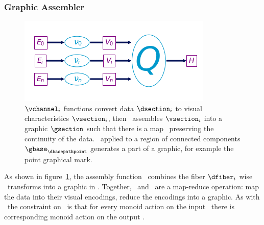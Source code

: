 \documentclass[../main.tex]{subfiles}
\begin{document}
\subsubsection{Graphic Assembler \vmark}
\label{sec:artist_q}
\begin{figure}[H]
    \includegraphics[width=\textwidth]{figures/math/path_of_q}
    \caption{$\vchannel_i$ functions convert data $\dsection_i$ to visual characteristics $\vsection_i$, then \vmark\ assembles $\vsection_i$ into a graphic $\gsection$ such that there is a map \vindex\ preserving the continuity of the data. \gsection\ applied to a region of connected components $\gbase_{\dbasepathpoint}$  generates a part of a graphic, for example the point graphical mark.} 
    \label{fig:artist_q}
\end{figure}

As shown in figure~\ref{fig:artist_q}, the assembly function \vmark\ combines the fiber $\dfiber_i$ wise \vchannel\ transforms into a graphic in \gtotal. Together, \vchannel\ and \vmark\ are a map-reduce operation: map the data into their visual encodings, reduce the encodings into a graphic. As with \vchannel\, the constraint on \vmark\ is that for every monoid action on the input \vsection\, there is corresponding monoid action on the output \gsection. 
\end{document}
